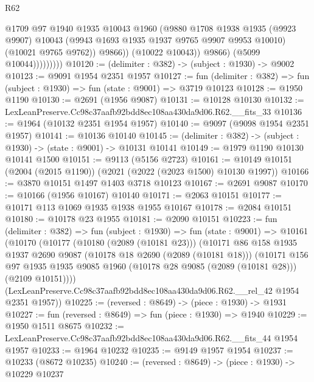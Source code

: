 \begin{lexlean}{R62}
\begin{coremodule}
                            @1709
                            @97
                            @1940
                            @1935
                            @10043
                            @1960
                            (@9880
                              @1708
                              @1938
                              @1935
                              (@9923 @9907)
                              @10043
                              (@9943 @1693 @1935 @1937 @9765 @9907 @9953 @10010)
                              (@10021 @9765 @9762))
                            @9866))
                        (@10022 @10043))
                      @9866)
                    (@5099 @10044)))))))))
@10120 := (delimiter : @382) -> (subject : @1930) -> @9002
@10123 := @9091 @1954 @2351 @1957
@10127 := fun (delimiter : @382) => fun (subject : @1930) => fun (state : @9001) => @3719 @10123
@10128 := @1950 @1190
@10130 := @2691 (@1956 @9087)
@10131 := @10128 @10130
@10132 := LexLeanPreserve.Cc98c37aafb92bdd8ec108aa430da9d06.R62.__fits_33
@10136 := @1964 (@10132 @2351 @1954 @1957)
@10140 := @9097 (@9098 @1954 @2351 @1957)
@10141 := @10136 @10140
@10145 := (delimiter : @382) -> (subject : @1930) -> (state : @9001) -> @10131 @10141
@10149 := @1979 @1190 @10130 @10141 @1500
@10151 := @9113 (@5156 @2723)
@10161 := @10149 @10151 (@2004 (@2015 @1190)) (@2021 (@2022 (@2023 @1500) @10130 @1997))
@10166 := @3870 @10151 @1497 @1403 @3718 @10123
@10167 := @2691 @9087
@10170 := @10166 (@1956 @10167) @10140
@10171 := @2063 @10151
@10177 := @10171 @113 @1069 @1935 @1938 @1955 @10167
@10178 := @2084 @10151
@10180 := @10178 @23 @1955
@10181 := @2090 @10151
@10223 := fun (delimiter : @382) =>
  fun (subject : @1930) =>
  fun (state : @9001) =>
  @10161
    (@10170
      (@10177
        (@10180 (@2089 (@10181 @23)))
        (@10171
          @86
          @158
          @1935
          @1937
          @2690
          @9087
          (@10178 @18 @2690 (@2089 (@10181 @18)))
          (@10171
            @156
            @97
            @1935
            @1935
            @9085
            @1960
            (@10178 @28 @9085 (@2089 (@10181 @28)))
            (@2109 @10151))))
      (LexLeanPreserve.Cc98c37aafb92bdd8ec108aa430da9d06.R62.__rel_42 @1954 @2351 @1957))
@10225 := (reversed : @8649) -> (piece : @1930) -> @1931
@10227 := fun (reversed : @8649) => fun (piece : @1930) => @1940
@10229 := @1950 @1511 @8675
@10232 := LexLeanPreserve.Cc98c37aafb92bdd8ec108aa430da9d06.R62.__fits_44 @1954 @1957
@10233 := @1964 @10232
@10235 := @9149 @1957 @1954
@10237 := @10233 (@8672 @10235)
@10240 := (reversed : @8649) -> (piece : @1930) -> @10229 @10237

\end{coremodule}
\end{lexlean}
